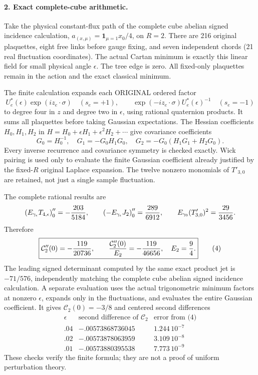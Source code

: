 \documentclass[11pt]{article}
\begin{document}
\paragraph{2. Exact complete-cube arithmetic.}
Take the physical constant-flux path of the complete cube abelian signed incidence calculation,
$a_{(x,\mu)}=\mathbf1_{\mu=1}x_0/4$, on $R=2$.
There are 216 original plaquettes, eight free links before gauge fixing,
and seven independent chords (21 real fluctuation coordinates).
The actual Cartan minimum is exactly this linear field for small physical
angle $\epsilon$. The tree edge is zero. All fixed-only plaquettes remain
in the action and the exact classical minimum.

The finite calculation expands each ORIGINAL ordered factor
\[
 U_e^*(\epsilon)\exp(i z_e\cdot\sigma)\quad(s_e=+1),\qquad
 \exp(-i z_e\cdot\sigma)U_e^*(\epsilon)^{-1}\quad(s_e=-1)
\]
to degree four in $z$ and degree two in $\epsilon$, using rational quaternion
products. It sums all plaquettes before taking Gaussian expectations.
The Hessian coefficients $H_0,H_1,H_2$ in
$H=H_0+\epsilon H_1+\epsilon^2H_2+\cdots$ give covariance coefficients
\[
 G_0=H_0^{-1},\quad G_1=-G_0H_1G_0,\quad
 G_2=-G_0(H_1G_1+H_2G_0).                                        \tag{3}
\]
Every inverse recurrence and covariance symmetry is checked exactly.
Wick pairing is used only to evaluate the finite Gaussian coefficient
already justified by the fixed-$R$ original Laplace expansion.
The twelve nonzero monomials of $T'_{3,0}$ are retained, not just a single
sample fluctuation.

The complete rational results are
\[
 \left(E_{\gamma_\epsilon}T_{4,\epsilon}\right)''_0
       =-{203\over5184},\qquad
 \left(-E_{\gamma_\epsilon}J_2\right)''_0={289\over6912},\qquad
 E_{\gamma_0}(T'_{3,0})^2={29\over3456}.
\]
Therefore
\[
 \boxed{\mathcal C_2''(0)=-{119\over20736},\qquad
        {\mathcal C_2''(0)\over E_2}=-{119\over46656},\quad
        E_2={9\over4}.}                                          \tag{4}
\]
The leading signed determinant computed by the same exact product jet is
$-71/576$, independently matching the complete cube abelian signed incidence calculation. A separate evaluation uses the
actual trigonometric minimum factors at nonzero $\epsilon$, expands only
in the fluctuations, and evaluates the entire Gaussian coefficient.
It gives $\mathcal C_2(0)=-3/8$ and centered second differences
\[
\begin{array}{c|r|r}
\epsilon&\text{second difference of }\mathcal C_2&\text{error from (4)}\\\hline
.04&-.00573868736045&1.244\,10^{-7}\\
.02&-.00573878063959&3.109\,10^{-8}\\
.01&-.00573880395538&7.773\,10^{-9}
\end{array}
\]
These checks verify the finite formula; they are not a proof of uniform
perturbation theory.
\end{document}
